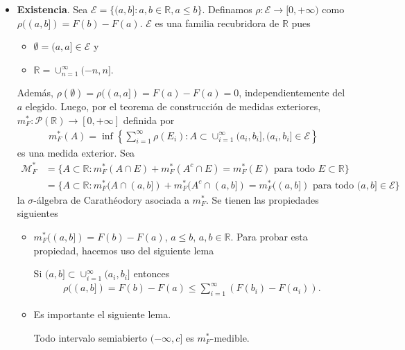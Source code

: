 \begin{itemize}
    \item \textbf{Existencia}. Sea $\mathcal{E} = \{ (a,b] : a,b \in \mathbb{R}, a \leq b \}$. Definamos $\rho : \mathcal{E} \longrightarrow [0,+\infty)$ como $\rho((a,b]) = F(b) - F(a)$. $\mathcal{E}$ es una familia recubridora de $\mathbb{R}$ pues
    \begin{itemize}
        \item $\emptyset = (a,a] \in \mathcal{E}$ y
        \item $\mathbb{R} = \cup_{n=1}^{\infty}(-n,n]$.
    \end{itemize}
    Además, $\rho(\emptyset) = \rho((a,a]) = F(a) - F(a) = 0$, independientemente del $a$ elegido. Luego, por el teorema de construcción de medidas exteriores, $m_F^*: \mathcal{P}(\mathbb{R}) \longrightarrow [0,+\infty]$ definida por
    \begin{align*}
        m_F^*(A) = \inf \left\{ \sum_{i=1}^{\infty}{\rho(E_i)} : A \subset \cup_{i=1}^{\infty}{(a_i,b_i]}, (a_i,b_i] \in \mathcal{E} \right\}
    \end{align*}
    es una medida exterior. Sea
    \begin{align*}
        \mathcal{M}_F^* &= \{ A \subset \mathbb{R} : m_F^*(A \cap E) + m_F^*(A^c \cap E) = m_F^*(E) \text{ para todo } E \subset \mathbb{R} \} \\
        &= \{ A \subset \mathbb{R} : m_F^*(A \cap (a,b]) + m_F^*(A^c \cap (a,b]) = m_F^*((a,b]) \text{ para todo } (a,b] \in \mathcal{E} \}
    \end{align*}
    la $\sigma$-álgebra de Carathéodory asociada a $m_F^*$. Se tienen las propiedades siguientes
    \begin{itemize}
        \item $m_F^*((a,b]) = F(b) - F(a)$, $a \leq b$, $a,b \in \mathbb{R}$. Para probar esta propiedad, hacemos uso del siguiente lema
        \begin{lema}
            Si $(a,b] \subset \cup_{i=1}^{\infty}{(a_i,b_i]}$ entonces
            \begin{align*}
                \rho((a,b]) = F(b) - F(a) \leq \sum_{i=1}^{\infty}(F(b_i) - F(a_i)).
            \end{align*}
        \end{lema}
        \item Es importante el siguiente lema.
        \begin{lema}
        Todo intervalo semiabierto $(-\infty,c]$ es $m_F^*$-medible.
        \end{lema}

\end{itemize}
\end{itemize}
